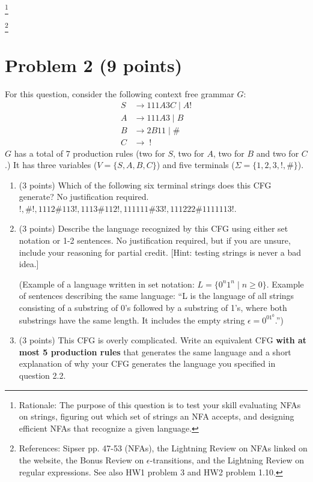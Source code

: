 \documentclass[letterpaper,11pt,twoside]{article}
\theoremstyle{plain}
\theoremstyle{definition}
\theoremstyle{remark}
\theoremstyle{restate}
\newcommand\blfootnote[1]{%
  \begingroup
  \renewcommand\thefootnote{}\footnote{#1}%
  \addtocounter{footnote}{-1}%
  \endgroup
}
\begin{document}
    \blfootnote{ Rationale: The purpose of this question is to test your skill evaluating NFAs on strings, figuring out which set of strings an NFA accepts, and designing efficient NFAs that recognize a given language. }
    \blfootnote{ References: Sipser pp. 47-53 (NFAs), the Lightning Review on NFAs linked on the website, the Bonus Review on $\epsilon$-transitions, and the Lightning Review on regular expressions. See also HW1 problem 3 and HW2 problem 1.10.}

\clearpage
\section{Problem 2 (9 points)}
    For this question, consider the following context free grammar $G$:
    \begin{align*}
        S &\rightarrow 111A3C \; | \; A! \\
        A &\rightarrow 111A3 \; | \; B \\
        B &\rightarrow 2B11 \; | \; \# \\
        C &\rightarrow \;!
    \end{align*}
    $G$ has a total of $7$ production rules (two for $S$, two for $A$, two for $B$ and two for $C$.) It has three variables ($V = \{S, A, B, C\}$) and five terminals ($\Sigma = \{1, 2, 3, !, \#\}$).

    \begin{enumerate}
        \item (3 points) Which of the following six terminal strings does this CFG generate? No justification required. $!, \#!, 1112\#113!, 1113\#112!, 111111\#33!, 111222\#1111113!$.
        
        \item (3 points) Describe the language recognized by this CFG using either set notation or 1-2 sentences. No justification required, but if you are unsure, include your reasoning for partial credit. [Hint: testing strings is never a bad idea.]
        
        (Example of a language written in set notation: $L = \{ 0^n1^n \; | \; n \geq 0\}$. Example of sentences describing the same language: ``L is the language of all strings consisting of a substring of 0's followed by a substring of 1's, where both substrings have the same length. It includes the empty string $\epsilon = 0^01^0$.'')
        
        \item (3 points) This CFG is overly complicated. Write an equivalent CFG \textbf{with at most 5 production rules} that generates the same language and a short explanation of why your CFG generates the language you specified in question 2.2.
    \end{enumerate}
\end{document}

